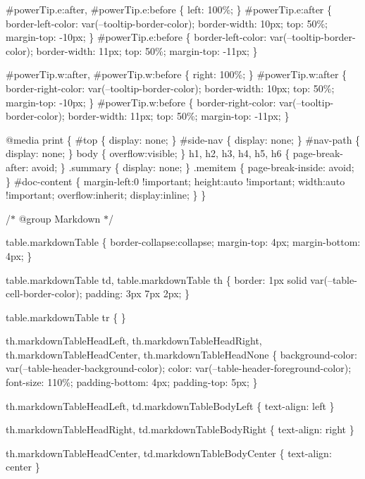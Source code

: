 \#power\+Tip.\+e\+:after, \#power\+Tip.\+e\+:before \{ left\+: 100\%; \} \#power\+Tip.\+e\+:after \{ border-\/left-\/color\+: var(--tooltip-\/border-\/color); border-\/width\+: 10px; top\+: 50\%; margin-\/top\+: -\/10px; \} \#power\+Tip.\+e\+:before \{ border-\/left-\/color\+: var(--tooltip-\/border-\/color); border-\/width\+: 11px; top\+: 50\%; margin-\/top\+: -\/11px; \}

\#power\+Tip.\+w\+:after, \#power\+Tip.\+w\+:before \{ right\+: 100\%; \} \#power\+Tip.\+w\+:after \{ border-\/right-\/color\+: var(--tooltip-\/border-\/color); border-\/width\+: 10px; top\+: 50\%; margin-\/top\+: -\/10px; \} \#power\+Tip.\+w\+:before \{ border-\/right-\/color\+: var(--tooltip-\/border-\/color); border-\/width\+: 11px; top\+: 50\%; margin-\/top\+: -\/11px; \}

@media print \{ \#top \{ display\+: none; \} \#side-\/nav \{ display\+: none; \} \#nav-\/path \{ display\+: none; \} body \{ overflow\+:visible; \} h1, h2, h3, h4, h5, h6 \{ page-\/break-\/after\+: avoid; \} .summary \{ display\+: none; \} .memitem \{ page-\/break-\/inside\+: avoid; \} \#doc-\/content \{ margin-\/left\+:0 !important; height\+:auto !important; width\+:auto !important; overflow\+:inherit; display\+:inline; \} \}

/\texorpdfstring{$\ast$}{*} @group Markdown \texorpdfstring{$\ast$}{*}/

table.\+markdown\+Table \{ border-\/collapse\+:collapse; margin-\/top\+: 4px; margin-\/bottom\+: 4px; \}

table.\+markdown\+Table td, table.\+markdown\+Table th \{ border\+: 1px solid var(--table-\/cell-\/border-\/color); padding\+: 3px 7px 2px; \}

table.\+markdown\+Table tr \{ \}

th.\+markdown\+Table\+Head\+Left, th.\+markdown\+Table\+Head\+Right, th.\+markdown\+Table\+Head\+Center, th.\+markdown\+Table\+Head\+None \{ background-\/color\+: var(--table-\/header-\/background-\/color); color\+: var(--table-\/header-\/foreground-\/color); font-\/size\+: 110\%; padding-\/bottom\+: 4px; padding-\/top\+: 5px; \}

th.\+markdown\+Table\+Head\+Left, td.\+markdown\+Table\+Body\+Left \{ text-\/align\+: left \}

th.\+markdown\+Table\+Head\+Right, td.\+markdown\+Table\+Body\+Right \{ text-\/align\+: right \}

th.\+markdown\+Table\+Head\+Center, td.\+markdown\+Table\+Body\+Center \{ text-\/align\+: center \}

